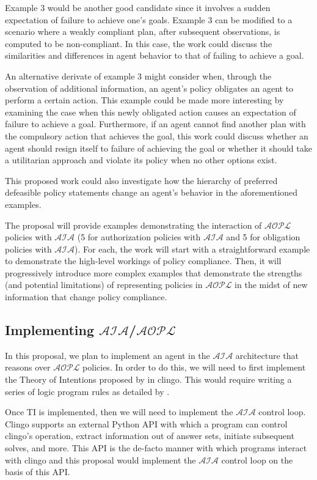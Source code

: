Example 3 would be another good candidate since it involves a sudden expectation of failure to achieve one's goals.
Example 3 can be modified to a scenario where a weakly compliant plan, after subsequent observations, is computed to be non-compliant.
In this case, the work could discuss the similarities and differences in agent behavior to that of failing to achieve a goal.

An alternative derivate of example 3 might consider when, through the observation of additional information, an agent's policy obligates an agent to perform a certain action.
This example could be made more interesting by examining the case when this newly obligated action causes an expectation of failure to achieve a goal.
Furthermore, if an agent cannot find another plan with the compulsory action that achieves the goal, this work could discuss whether an agent should resign itself to failure of achieving the goal or whether it should take a utilitarian approach and violate its policy when no other options exist.

This proposed work could also investigate how the hierarchy of preferred defeasible policy statements change an agent's behavior in the aforementioned examples.

The proposal will provide examples demonstrating the interaction of $\mathcal{AOPL}$ policies with $\mathcal{AIA}$ (5 for authorization policies with $\mathcal{AIA}$ and 5 for obligation policies with $\mathcal{AIA}$).
For each, the work will start with a straightforward example to demonstrate the high-level workings of policy compliance.
Then, it will progressively introduce more complex examples that demonstrate the strengths (and potential limitations) of representing policies in $\mathcal{AOPL}$ in the midst of new information that change policy compliance.

\subsection{Implementing $\mathcal{AIA}$/$\mathcal{AOPL}$}

In this proposal, we plan to implement an agent in the $\mathcal{AIA}$ architecture that reasons over $\mathcal{AOPL}$ policies.
In order to do this, we will need to first implement the Theory of Intentions proposed by \citet{blount_towards_2014} in clingo.
This would require writing a series of logic program rules as detailed by \citet{blount_towards_2014}.

Once TI is implemented, then we will need to implement the $\mathcal{AIA}$ control loop.
Clingo supports an external Python API with which a program can control clingo's operation, extract information out of answer sets, initiate subsequent solves, and more.
This API is the de-facto manner with which programs interact with clingo and this proposal would implement the $\mathcal{AIA}$ control loop on the basis of this API.

